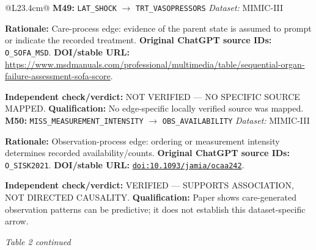 \begin{tabular}{@{}L{23.4cm}@{}}
\addlinespace[2pt]
\midrule
\textbf{M49:} \nolinkurl{LAT_SHOCK} $\rightarrow$ \nolinkurl{TRT_VASOPRESSORS} \hfill \textit{Dataset:} MIMIC-III\par\textbf{Rationale:} Care-process edge: evidence of the parent state is assumed to prompt or indicate the recorded treatment. \textbf{Original ChatGPT source IDs:} \nolinkurl{O_SOFA_MSD}. \textbf{DOI/stable URL:} \url{https://www.msdmanuals.com/professional/multimedia/table/sequential-organ-failure-assessment-sofa-score}.\par\textbf{Independent check/verdict:} NOT VERIFIED --- NO SPECIFIC SOURCE MAPPED. \textbf{Qualification:} No edge-specific locally verified source was mapped. \\
\addlinespace[2pt]
\midrule
\textbf{M50:} \nolinkurl{MISS_MEASUREMENT_INTENSITY} $\rightarrow$ \nolinkurl{OBS_AVAILABILITY} \hfill \textit{Dataset:} MIMIC-III\par\textbf{Rationale:} Observation-process edge: ordering or measurement intensity determines recorded availability/counts. \textbf{Original ChatGPT source IDs:} \nolinkurl{O_SISK2021}. \textbf{DOI/stable URL:} \href{https://doi.org/10.1093/jamia/ocaa242}{\nolinkurl{doi:10.1093/jamia/ocaa242}}.\par\textbf{Independent check/verdict:} VERIFIED --- SUPPORTS ASSOCIATION, NOT DIRECTED CAUSALITY. \textbf{Qualification:} Paper shows care-generated observation patterns can be predictive; it does not establish this dataset-specific arrow. \\
\addlinespace[2pt]
\midrule
\bottomrule
\end{tabular}
\clearpage
\textit{Table 2 continued}\par

